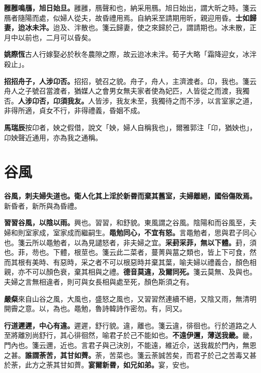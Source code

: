 \textbf{雝雝鳴鴈，旭日始旦。}{\footnotesize 雝雝，鴈聲和也，納采用鴈。旭日始出，謂大昕之時。箋云鴈者隨陽而處，似婦人從夫，故昏禮用焉。自納采至請期用昕，親迎用昏。}\textbf{士如歸妻，迨冰未泮。}{\footnotesize 迨及、泮散也。箋云歸妻，使之來歸於己，謂請期也。冰未散，正月中以前也，二月可以昏矣。}

\begin{quoting}\textbf{姚際恆}古人行嫁娶必於秋冬農隙之際，故云迨冰未泮。荀子大略「霜降迎女，冰泮殺止」。\end{quoting}

\textbf{招招舟子，人涉卬否。}{\footnotesize 招招，號召之貌。舟子，舟人，主濟渡者。卬，我也。箋云舟人之子號召當渡者，猶媒人之會男女無夫家者使為妃匹，人皆從之而渡，我獨否。}\textbf{人涉卬否，卬須我友。}{\footnotesize 人皆涉，我友未至，我獨待之而不涉，以言室家之道，非得所適，貞女不行，非得禮義，昏姻不成。}

\begin{quoting}\textbf{馬瑞辰}按卬者，姎之假借，說文「姎，婦人自稱我也」，爾雅郭注「卬，猶姎也」，卬姎聲近通用，亦為我之通稱。\end{quoting}

\section{谷風}


\textbf{谷風，刺夫婦失道也。衛人化其上淫於新昬而棄其舊室，夫婦離絕，國俗傷敗焉。}{\footnotesize 新昏者，新所與為昏禮。}

\textbf{習習谷風，以陰以雨。}{\footnotesize 興也。習習，和舒貌。東風謂之谷風。陰陽和而谷風至，夫婦和則室家成，室家成而繼嗣生。}\textbf{黽勉同心，不宜有怒。}{\footnotesize 言黽勉者，思與君子同心也。箋云所以黽勉者，以為見譴怒者，非夫婦之宜。}\textbf{采葑采菲，無以下體。}{\footnotesize 葑，須也。菲，芴也。下體，根莖也。箋云此二菜者，蔓菁與葍之類也，皆上下可食，然而其根有美時、有惡時，采之者不可以根惡時并棄其葉，喻夫婦以禮義合，顏色相親，亦不可以顏色衰，棄其相與之禮。}\textbf{德音莫違，及爾同死。}{\footnotesize 箋云莫無、及與也。夫婦之言無相違者，則可與女長相與處至死，顏色斯須之有。}

\begin{quoting}\textbf{嚴粲}來自山谷之風，大風也，盛怒之風也，又習習然連續不絕，又陰又雨，無清明開霽之意。以，為也。黽勉，魯詩韓詩作密勿。有，同又。\end{quoting}

\textbf{行道遲遲，中心有違。}{\footnotesize 遲遲，舒行貌。違，離也。箋云違，徘徊也。行於道路之人至將離別尚舒行，其心徘徊然，喻君子於己不能如也。}\textbf{不遠伊邇，薄送我畿。}{\footnotesize 畿，門內也。箋云邇，近也。言君子與己決別，不能遠，維近尒，送我裁於門內，無恩之甚。}\textbf{誰謂荼苦，其甘如薺。}{\footnotesize 荼，苦菜也。箋云荼誠苦矣，而君子於己之苦毒又甚於荼，此方之荼其甘如薺。}\textbf{宴爾新昬，如兄如弟。}{\footnotesize 宴，安也。}

